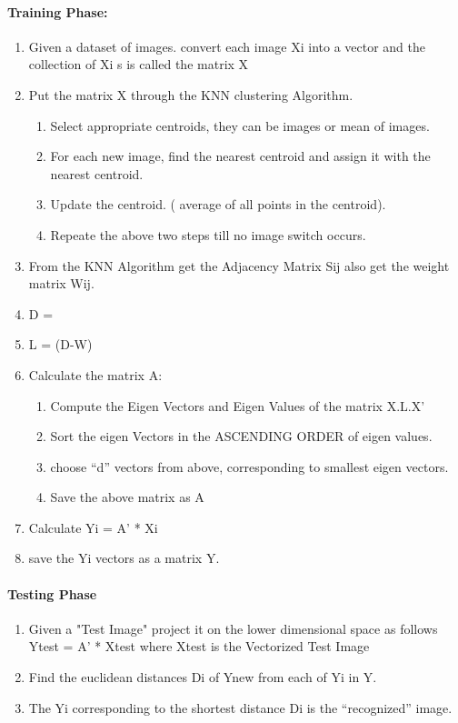 \documentclass[12pt,a4paper]{book}
\begin{document}
\paragraph{Training Phase:}
	\begin{enumerate}
\item Given a dataset of images. convert each image Xi into a vector
and the collection of Xi s is called the matrix X

\item Put the matrix X through the KNN clustering Algorithm.
\begin{enumerate}
\item Select appropriate centroids, they can be images or mean of images.
\item For each new image, find the nearest centroid and assign it with the nearest centroid.
\item Update the centroid. ( average of all points in the centroid).
\item Repeate the above two steps till no image switch occurs.
\end{enumerate}
\item From the KNN Algorithm get the Adjacency Matrix Sij also get
the weight matrix Wij.

\item D = 
\item L = (D-W)
\item Calculate the matrix A:
\begin{enumerate}

\item Compute the Eigen Vectors and Eigen Values of the matrix X.L.X'
\item Sort the eigen Vectors in the ASCENDING ORDER of eigen values.
\item choose “d” vectors from above, corresponding to smallest eigen vectors.
\item Save the above matrix as A
\end{enumerate}
\item Calculate Yi = A' * Xi
\item save the Yi vectors as a matrix Y.
\end{enumerate}

\paragraph{Testing Phase}
	\begin{enumerate}
\item Given a "Test Image" project it on the lower dimensional space as follows
	Ytest = A' * Xtest 
where Xtest is the Vectorized Test Image
\item Find the euclidean distances Di of Ynew from each of Yi in Y.
\item The Yi corresponding to the shortest distance Di is the “recognized” image.
		\end{enumerate}
\end{document}
